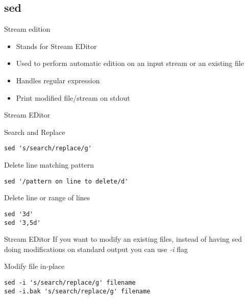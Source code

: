 \subsection{sed}

\begin{frame}[fragile]{Stream edition}
  \begin{itemize}
    \item Stands for Stream EDitor
    \pause
    \item Used to perform automatic edition on an input stream or an existing file
    \pause
    \item Handles regular expression
    \pause
    \item Print modified file/stream on stdout
  \end{itemize}
\end{frame}

\begin{frame}[fragile]{Stream EDitor}
  \begin{exampleblock}{Search and Replace}
    \begin{lstlisting}[showstringspaces=false,basicstyle=\tiny]
sed 's/search/replace/g'
    \end{lstlisting}
  \end{exampleblock}
  \pause

  \begin{exampleblock}{Delete line matching pattern}
    \begin{lstlisting}[showstringspaces=false,basicstyle=\tiny]
sed '/pattern on line to delete/d'
    \end{lstlisting}
  \end{exampleblock}
  \pause

  \begin{exampleblock}{Delete line or range of lines}
    \begin{lstlisting}[showstringspaces=false,basicstyle=\tiny]
sed '3d'
sed '3,5d'
    \end{lstlisting}
  \end{exampleblock}
\end{frame}

\begin{frame}[fragile]{Stream EDitor}
If you want to modify an existing files, instead of having sed doing modifications on standard output you can use \emph{-i} flag
\pause
  \begin{exampleblock}{Modify file in-place}
    \begin{lstlisting}[showstringspaces=false,basicstyle=\tiny]
sed -i 's/search/replace/g' filename
sed -i.bak 's/search/replace/g' filename
    \end{lstlisting}
  \end{exampleblock}
\end{frame}

